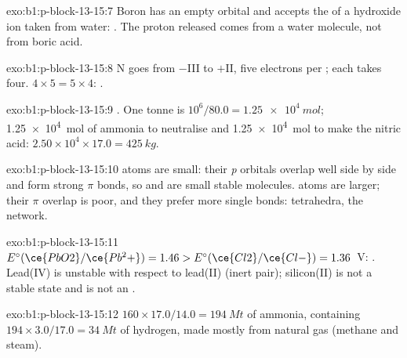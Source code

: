 \begin{solution}{exo:b1:p-block-13-15:7}
Boron has an empty orbital and accepts the  of a hydroxide ion
taken from water: . The proton
released comes from a water molecule, not from boric acid.
\end{solution}

\begin{solution}{exo:b1:p-block-13-15:8}
N goes from $-$III to $+$II, five electrons per ; each  takes
four. $4 \times 5 = 5 \times 4$: .
\end{solution}

\begin{solution}{exo:b1:p-block-13-15:9}
. One tonne is $10^6/80.0 = \qty{1.25e4}{mol}$;
\qty{1.25e4}{mol} of ammonia to neutralise and \qty{1.25e4}{mol} to make
the nitric acid: $2.50 \times 10^4 \times 17.0 = \qty{425}{kg}$.
\end{solution}

\begin{solution}{exo:b1:p-block-13-15:10}
 atoms are small: their \textit{p} orbitals overlap well side
by side and form strong $\pi$ bonds, so  and  are small
stable molecules.  atoms are larger; their $\pi$ overlap is
poor, and they prefer more single bonds:  tetrahedra, the
 network.
\end{solution}

\begin{solution}{exo:b1:p-block-13-15:11}
$E^\circ(\ce{PbO2}/\ce{Pb^2+}) = 1.46 > E^\circ(\ce{Cl2}/\ce{Cl-}) = 1.36$~V:
. Lead(IV) is unstable with
respect to lead(II) (inert pair); silicon(II) is not a stable state and
 is not an .
\end{solution}

\begin{solution}{exo:b1:p-block-13-15:12}
$160 \times 17.0/14.0 = \qty{194}{Mt}$ of ammonia, containing $194 \times
3.0/17.0 = \qty{34}{Mt}$ of hydrogen, made mostly from natural gas
(methane and steam).
\end{solution}


